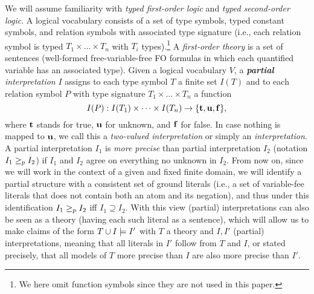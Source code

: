 We will assume familiarity with \emph{typed first-order logic} and \emph{typed second-order logic}.  
A logical vocabulary consists of a set of type symbols, typed constant symbols, and relation symbols with associated type signature (i.e., each relation symbol is typed $T_1\times \dots \times T_n$ with $T_i$ types).\footnote{We here omit function symbols since they are not used in this paper.}
A \emph{first-order theory} is a set of sentences (well-formed free-variable-free FO formulas in which each quantified variable has an associated type). 
Given a logical vocabulary $V$, a \emph{\textbf{partial} interpretation} $I$ assigns to each type symbol $T$ a finite set $I(T)$ and to each 
relation symbol $P$ with type signature $T_1\times \dots \times T_n$ a function 
\[I(P): I(T_1)\times \dots \times I(T_n)\to \{\mathbf{t},\mathbf{u},\mathbf{f}\},\] 
where $\mathbf{t}$ stands for true, $\mathbf{u}$ for unknown, and $\mathbf{f}$ for false. In case nothing is mapped to $\mathbf{u}$, we call this a \emph{two-valued interpretation} or simply an \emph{interpretation}.
A partial interpretation $I_1$ is \emph{more precise} than partial interpretation $I_2$ (notation $I_1\geq_p I_2$) if $I_1$ and $I_2$ agree on everything no unknown in $I_2$.
From now on, since we will work in the context of a given and fixed finite domain, we will identify a partial structure with a consistent set of ground literals (i.e., a set of variable-fee literals that does not contain both an atom and its negation), and thus under this identification $I_1\geq_p I_2$ iff $I_1\supseteq I_2$.
With this view (partial) interpretations can also be seen as a theory (having each such literal as a sentence), which will allow us to make claims of the form 
$T\cup I \models I'$ with $T$ a theory and  $I,I'$ (partial) interpretations, meaning that all literals in $I'$ follow from $T$ and $I$, or stated precisely, that all models of $T$ more precise than $I$ are also more precise than $I'$. 
% 
